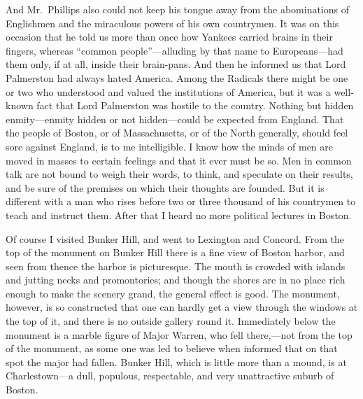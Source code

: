And Mr.\ Phillips also could not keep his tongue away from the
abominations of Englishmen and the miraculous powers of his own
countrymen.  It was on this occasion that he told us more than once
how Yankees carried brains in their fingers, whereas ``common
people''---alluding by that name to Europeans---had them only, if at
all, inside their brain-pans.  And then he informed us that Lord
Palmerston had always hated America.  Among the Radicals there
might be one or two who understood and valued the institutions of
America, but it was a well-known fact that Lord Palmerston was
hostile to the country.  Nothing but hidden enmity---enmity hidden
or not hidden---could be expected from England.  That the people of
Boston, or of Massachusetts, or of the North generally, should feel
sore against England, is to me intelligible.  I know how the minds
of men are moved in masses to certain feelings and that it ever
must be so.  Men in common talk are not bound to weigh their words,
to think, and speculate on their results, and be sure of the
premises on which their thoughts are founded.  But it is different
with a man who rises before two or three thousand of his countrymen
to teach and instruct them.  After that I heard no more political
lectures in Boston.

Of course I visited Bunker Hill, and went to Lexington and Concord.
From the top of the monument on Bunker Hill there is a fine view of
Boston harbor, and seen from thence the harbor is picturesque.  The
mouth is crowded with islands and jutting necks and promontories;
and though the shores are in no place rich enough to make the
scenery grand, the general effect is good.  The monument, however,
is so constructed that one can hardly get a view through the
windows at the top of it, and there is no outside gallery round it.
Immediately below the monument is a marble figure of Major Warren,
who fell there,---not from the top of the monument, as some one was
led to believe when informed that on that spot the major had
fallen.  Bunker Hill, which is little more than a mound, is at
Charlestown---a dull, populous, respectable, and very unattractive
suburb of Boston.

